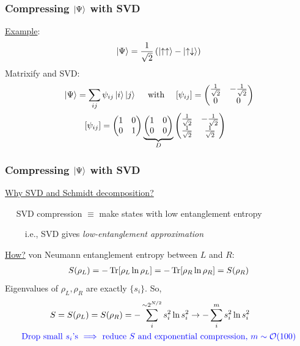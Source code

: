 \documentclass{beamer}
\theoremstyle{definition}
\newcommand{\lp}{\left(}
\newcommand{\rp}{\right)}
\newcommand{\f}[2]{\frac{#1}{#2}}
\begin{document}
\begin{frame}
	\frametitle{Compressing $\ket{\Psi}$ with SVD}
	
	\underline{Example}:  
	\begin{align*}
		\ket{\Psi} = \f{1}{\sqrt{2}}\lp \ket{\uparrow\uparrow} - \ket{\uparrow\downarrow} \rp
	\end{align*}
	Matrixify and SVD:
	\begin{align*}
	&\ket{\Psi} = \sum_{ij}\psi_{ij}\ket{i}\ket{j} \quad \text{ with } \quad   [\psi_{ij}] = \begin{pmatrix}
			\f{1}{\sqrt{2}} & -\f{1}{\sqrt{2}} \\ 0 & 0
		\end{pmatrix}\\
	&\quad\quad \,\,\,[\psi_{ij}] = \begin{pmatrix}
			1 & 0 \\ 0 & 1
		\end{pmatrix}
	\underbrace{\begin{pmatrix}
		1 & 0 \\ 0 & 0 
	\end{pmatrix}}_D
	\begin{pmatrix}
		\f{1}{\sqrt{2}} & -\f{1}{\sqrt{2}} \\ 	\f{1}{\sqrt{2}} & \f{1}{\sqrt{2}}
	\end{pmatrix}
	\end{align*}

\end{frame}


\begin{frame}
	\frametitle{Compressing $\ket{\Psi}$ with SVD}
	
	\underline{Why SVD and Schmidt decomposition?} \\
	
	\vspace{8pt}
	
	$\quad$ SVD compression $\equiv$ make states with low entanglement entropy\\
	
	\vspace{8pt}
	
	\indent $\quad\quad$ i.e., SVD gives \textit{low-entanglement approximation}\\
	
	\vspace{8pt}
	
	\underline{How?} von Neumann entanglement entropy between $L$ and $R$:
	\begin{align*}
		S(\rho_L) = -\Tr[\rho_L \ln \rho_L] = -\Tr[\rho_R \ln \rho_R] = S(\rho_R) 
	\end{align*}
	Eigenvalues of $\rho_L, \rho_R$ are exactly $\{s_i\}$. So,
	\vspace{-7pt}
	\begin{align*}
		&\quad\quad \quad \,\, S = S(\rho_L) = S(\rho_R) = -\sum_i^{\sim 2^{N/2}} s_i^2 \ln s_i^2 \to -\sum_i^m s_i^2 \ln s_i^2\\
		&\text{\textcolor{blue}{Drop small $s_i$'s $\implies$ reduce $S$ and exponential compression, $m\sim \mathcal{O}(100)$}}
	\end{align*}
	
\end{frame}
\end{document}
